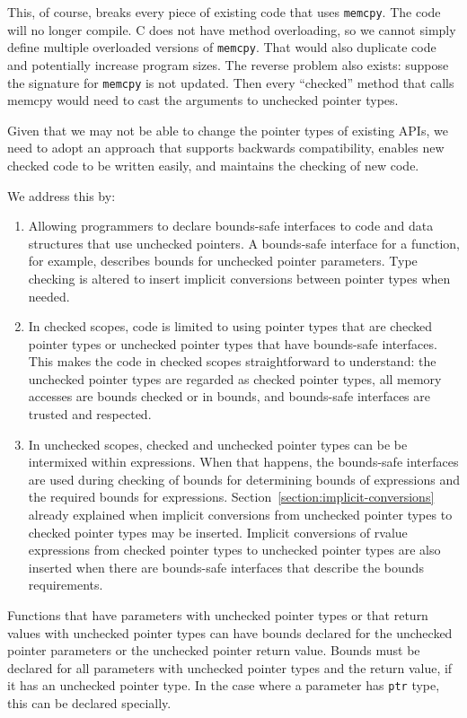 This, of course, breaks every piece of existing code that uses \texttt{memcpy}.
The code will no longer compile. C does not have method overloading, so
we cannot simply define multiple overloaded versions of \texttt{memcpy}. That
would also duplicate code and potentially increase program sizes.
The reverse problem also exists: suppose the signature for \texttt{memcpy} is not
updated. Then every ``checked'' method that calls memcpy would need to cast
the arguments to unchecked pointer types.

Given that we may not be able to change the pointer types of existing
APIs, we need to adopt an approach that supports backwards
compatibility, enables new checked code to be written easily, and maintains
the checking of new code.

We address this by:

\begin{enumerate}
\item
  Allowing programmers to declare bounds-safe interfaces to code and
  data structures that use unchecked pointers. A bounds-safe interface for
  a function, for example, describes bounds for unchecked pointer
  parameters.   Type checking is altered to insert implicit conversions
  between pointer types when needed.
\item
  In checked scopes, code is limited to using pointer types that are 
  checked pointer types or unchecked pointer types that have bounds-safe interfaces.
  This makes the code in checked scopes straightforward to understand:
  the unchecked pointer types are regarded as checked pointer types, all memory
  accesses are bounds checked or in bounds, and bounds-safe interfaces are trusted
  and respected.
\item
  In unchecked scopes, checked and unchecked pointer types can be
  be intermixed within expressions.  When that happens, the bounds-safe
  interfaces are used during checking of bounds for determining bounds
  of expressions and the required bounds for expressions. 
  Section~\ref{section:implicit-conversions} already
  explained when implicit conversions from unchecked pointer types to checked pointer
  types may be inserted.   Implicit conversions of rvalue expressions 
  from checked pointer types to unchecked pointer types are also inserted when
  there are bounds-safe interfaces that describe the bounds requirements.
\end{enumerate}

Functions that have parameters with unchecked pointer types or that return
values with unchecked pointer types can have bounds declared for the unchecked
pointer parameters or the unchecked pointer return value. Bounds must be
declared for all parameters with unchecked pointer types and the return
value, if it has an unchecked pointer type. In the case where a parameter
has \texttt{ptr} type, this can be declared specially.

